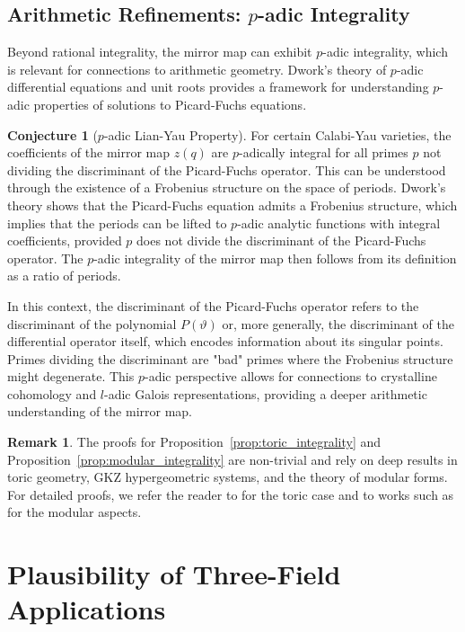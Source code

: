 \documentclass{book}
\newcommand{\varthetaop}{\vartheta} %
\newcommand{\qexp}{q} %
\newcommand{\zmod}{z} %
\theoremstyle{definition}
\newtheorem{remark}[theorem]{Remark}
\newtheorem{conjecture}[theorem]{Conjecture}
\begin{document}
\section{Arithmetic Refinements: $p$-adic Integrality}
Beyond rational integrality, the mirror map can exhibit $p$-adic integrality, which is relevant for connections to arithmetic geometry. Dwork's theory of $p$-adic differential equations and unit roots provides a framework for understanding $p$-adic properties of solutions to Picard-Fuchs equations.
\begin{conjecture}[$p$-adic Lian-Yau Property]
\label{conj:p_adic_integrality}
For certain Calabi-Yau varieties, the coefficients of the mirror map $\zmod(\qexp)$ are $p$-adically integral for all primes $p$ not dividing the discriminant of the Picard-Fuchs operator. This can be understood through the existence of a Frobenius structure on the space of periods. Dwork's theory shows that the Picard-Fuchs equation admits a Frobenius structure, which implies that the periods can be lifted to $p$-adic analytic functions with integral coefficients, provided $p$ does not divide the discriminant of the Picard-Fuchs operator. The $p$-adic integrality of the mirror map then follows from its definition as a ratio of periods.
\end{conjecture}
In this context, the discriminant of the Picard-Fuchs operator refers to the discriminant of the polynomial $P(\varthetaop)$ or, more generally, the discriminant of the differential operator itself, which encodes information about its singular points. Primes dividing the discriminant are "bad" primes where the Frobenius structure might degenerate. This $p$-adic perspective allows for connections to crystalline cohomology and $l$-adic Galois representations, providing a deeper arithmetic understanding of the mirror map.

\begin{remark}
The proofs for Proposition~\ref{prop:toric_integrality} and Proposition~\ref{prop:modular_integrality} are non-trivial and rely on deep results in toric geometry, GKZ hypergeometric systems, and the theory of modular forms. For detailed proofs, we refer the reader to \cite{LianYau1997} for the toric case and to works such as \cite{Zagier1997} for the modular aspects.
\end{remark}

\chapter{Plausibility of Three-Field Applications}
\label{chap:applications}
\end{document}
